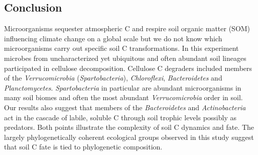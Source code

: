 \subsection{Conclusion} 
Microorganisms sequester atmospheric C and respire soil organic matter (SOM)
influencing climate change on a global scale but we do not know which
microorganisms carry out specific soil C transformations. In this experiment
microbes from uncharacterized yet ubiquitous and often abundant soil lineages
participated in cellulose decomposition. Cellulose C degraders included members
of the \textit{Verrucomicrobia} (\textit{Spartobacteria}),
\textit{Chloroflexi}, \textit{Bacteroidetes} and \textit{Planctomycetes}.
\textit{Spartobacteria} in particular are abundant microorganisms in many soil
biomes and often the most abundant \textit{Verrucomicrobia} order in soil. Our
results also suggest that members of the \textit{Bacteroidetes} and
\textit{Actinobacteria} act in the cascade of labile, soluble C through soil
trophic levels possibly as predators. Both points illustrate the
complexity of soil C dynamics and fate. The largely phylogenetically
coherent ecological groups observed in this study suggest that soil C fate
is tied to phylogenetic composition.
